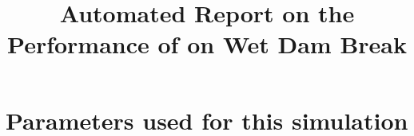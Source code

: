 \documentclass[11pt,a4paper]{article}
\begin{document}
 

\title{Automated Report on the Performance of \anuga{} on Wet Dam Break}
\maketitle




\section{Parameters used for this simulation}





\end{document}

